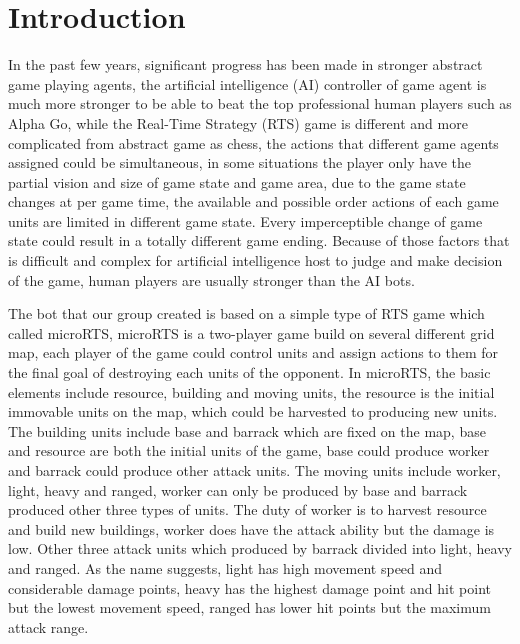 \section{Introduction}

In the past few years, significant progress has been made in stronger abstract game playing agents,
the artificial intelligence (AI) controller of game agent is much more stronger to be able to beat the top
professional human players such as Alpha Go, while the Real-Time Strategy (RTS) game is different and
more complicated from abstract game as chess, the actions that different game agents assigned could be
simultaneous, in some situations the player only have the partial vision and size of game state and game
area, due to the game state changes at per game time, the available and possible order actions of each
game units are limited in different game state. Every imperceptible change of game state could result in
a totally different game ending. Because of those factors that is difficult and complex for artificial
intelligence host to judge and make decision of the game, human players are usually stronger than the AI bots.

The bot that our group created is based on a simple type of RTS game which called microRTS, microRTS is a
two-player game build on several different grid map, each player of the game could control units and assign
actions to them for the final goal of destroying each units of the opponent. In microRTS, the basic elements
include resource, building and moving units, the resource is the initial immovable units on the map, which
could be harvested to producing new units. The building units include base and barrack which are fixed on
the map, base and resource are both the initial units of the game, base could produce worker and barrack
could produce other attack units. The moving units include worker, light, heavy and ranged, worker can only
be produced by base and barrack produced other three types of units. The duty of worker is to harvest resource
and build new buildings, worker does have the attack ability but the damage is low. Other three attack units
which produced by barrack divided into light, heavy and ranged. As the name suggests, light has high movement
speed and considerable damage points, heavy has the highest damage point and hit point but the lowest movement
speed, ranged has lower hit points but the maximum attack range.

